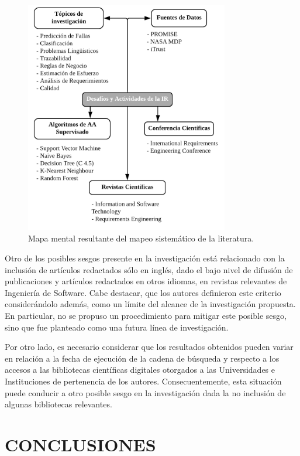 \documentclass[journal]{IEEEtran}
\begin{document}
\begin{figure}[!t]
\centering
\includegraphics[width=3.5in]{figures/figure13_Guada.png}
\caption{Mapa mental resultante del mapeo sistemático de la literatura.}
\label{fig:13}
\end{figure}

Otro de los posibles sesgos presente en la investigación está relacionado con la inclusión de artículos redactados sólo en inglés, dado el bajo nivel de difusión de publicaciones y artículos redactados en otros idiomas, en revistas relevantes de Ingeniería de Software. Cabe destacar, que los autores definieron este criterio considerándolo además, como un límite del alcance de la investigación propuesta. En particular, no se propuso un procedimiento para mitigar este posible sesgo, sino que fue  planteado como una futura línea de investigación.  

Por otro lado, es necesario considerar que los resultados obtenidos pueden variar en relación a la fecha de ejecución de la cadena de búsqueda y respecto a los accesos a las bibliotecas científicas digitales otorgados a las Universidades e Instituciones de pertenencia de los autores. Consecuentemente, esta situación puede conducir a otro posible sesgo en la investigación dada la no inclusión de algunas bibliotecas relevantes.


\section{CONCLUSIONES}
\end{document}
